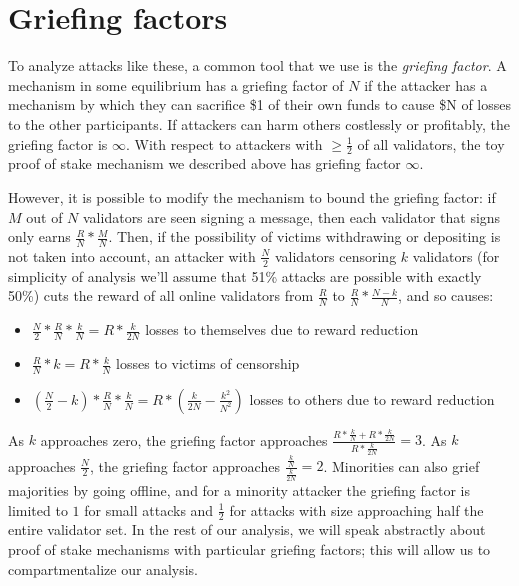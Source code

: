 \documentclass[12pt]{article}
\begin{document}
\section{Griefing factors}

To analyze attacks like these, a common tool that we use is the \emph{griefing factor}. A mechanism in some equilibrium has a griefing factor of $N$ if the attacker has a mechanism by which they can sacrifice \$1 of their own funds to cause \$N of losses to the other participants. If attackers can harm others costlessly or profitably, the griefing factor is $\infty$. With respect to attackers with $\ge \frac{1}{2}$ of all validators, the toy proof of stake mechanism we described above has griefing factor $\infty$.

However, it is possible to modify the mechanism to bound the griefing factor: if $M$ out of $N$ validators are seen signing a message, then each validator that signs only earns $\frac{R}{N} * \frac{M}{N}$. Then, if the possibility of victims withdrawing or depositing is not taken into account, an attacker with $\frac{N}{2}$ validators censoring $k$ validators (for simplicity of analysis we'll assume that 51\% attacks are possible with exactly 50\%) cuts the reward of all online validators from $\frac{R}{N}$ to $\frac{R}{N} * \frac{N-k}{N}$, and so causes:

\begin{itemize}
\item $\frac{N}{2} * \frac{R}{N} * \frac{k}{N} = R * \frac{k}{2N}$ losses to themselves due to reward reduction
\item $\frac{R}{N} * k = R * \frac{k}{N}$ losses to victims of censorship
\item $(\frac{N}{2} - k) * \frac{R}{N} * \frac{k}{N} = R * (\frac{k}{2N} - \frac{k^2}{N^2})$ losses to others due to reward reduction 
\end{itemize}

As $k$ approaches zero, the griefing factor approaches $\frac{R * \frac{k}{N} + R * \frac{k}{2N}}{R * \frac{k}{2N}} = 3$. As $k$ approaches $\frac{N}{2}$, the griefing factor approaches $\frac{\frac{k}{N}}{\frac{k}{2N}} = 2$. Minorities can also grief majorities by going offline, and for a minority attacker the griefing factor is limited to $1$ for small attacks and $\frac{1}{2}$ for attacks with size approaching half the entire validator set. In the rest of our analysis, we will speak abstractly about proof of stake mechanisms with particular griefing factors; this will allow us to compartmentalize our analysis.
\end{document}
